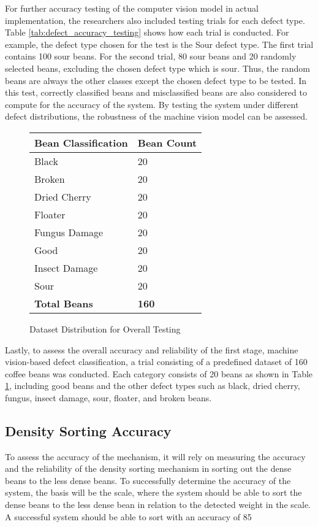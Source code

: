 For further accuracy testing of the computer vision model in actual implementation, the researchers also included testing trials for each defect type. Table \ref{tab:defect_accuracy_testing} shows how each trial is conducted. For example, the defect type chosen for the test is the Sour defect type. The first trial contains 100 sour beans. For the second trial, 80 sour beans and 20 randomly selected beans, excluding the chosen defect type which is sour. Thus, the random beans are always the other classes except the chosen defect type to be tested. In this test, correctly classified beans and misclassified beans are also considered to compute for the accuracy of the system. By testing the system under different defect distributions, the robustness of the machine vision model can be assessed.

\begin{figure}[H]
	\centering
	\begin{tabularx}{\textwidth}{p{}|p{}}
		\caption{Dataset Distribution for Overall Testing} \label{tab:dataset_distribution} \\
		\hline \hline
		\textbf{Bean Classification} & \textbf{Bean Count} \\
		\hline
		Black &  20 \\
		\hline
		Broken & 20 \\
		\hline
		Dried Cherry & 20 \\
		\hline
		Floater & 20 \\
		\hline
		Fungus Damage & 20 \\
		\hline
		Good & 20 \\
		\hline
		Insect Damage & 20 \\
		\hline
		Sour & 20 \\
		\hline
		\textbf{Total Beans} & \textbf{160} \\
		\hline
	\end{tabularx}
\end{figure}

Lastly, to assess the overall accuracy and reliability of the first stage, machine vision-based defect classification, a trial consisting of a predefined dataset of 160 coffee beans was conducted. Each category consists of 20 beans as shown in Table \ref{tab:dataset_distribution}, including good beans and the other defect types such as black, dried cherry, fungus, insect damage, sour, floater, and broken beans.

\subsection{Density Sorting Accuracy}

To assess the accuracy of the mechanism, it will rely on measuring the accuracy and the reliability of the density sorting mechanism in sorting out the dense beans to the less dense beans. To successfully determine the accuracy of the system, the basis will be the scale, where the system should be able to sort the dense beans to the less dense bean in relation to the detected weight in the scale. A successful system should be able to sort with an accuracy of 85%
